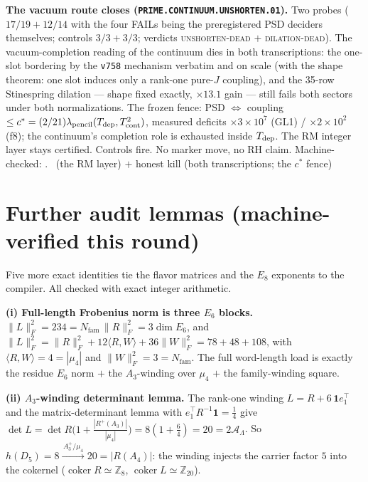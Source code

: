 \documentclass[11pt,a4paper]{article}
\newcommand{\Nfam}{N_{\mathrm{fam}}}
\newcommand{\AL}{\mathcal A_\Lambda}
\newcommand{\Z}{\mathbb{Z}}
\theoremstyle{definition}
\begin{document}
\par\smallskip\noindent\textbf{The vacuum route closes
(\texttt{PRIME.CONTINUUM.UNSHORTEN.01}).}
Two probes ($17/19+12/14$ with the four FAILs being the
preregistered PSD deciders themselves; controls $3/3+3/3$;
verdicts \textsc{unshorten-dead} $+$ \textsc{dilation-dead}).  The
vacuum-completion reading of the continuum dies in both
transcriptions: the one-slot bordering by the \texttt{v758}
mechanism verbatim and on scale (with the shape theorem: one slot
induces only a rank-one pure-$J$ coupling), and the 35-row
Stinespring dilation --- shape fixed exactly, $\times13.1$ gain
--- still fails both sectors under both normalizations.  The
frozen fence: PSD $\iff$ coupling $\le
c^*=(2/21)\lambda_{\rm pencil}(T_{\rm dep},T_{\rm cont}^2)$,
measured deficits $\times3\times10^7$ (GL1) /
$\times2\times10^2$ (f8); the continuum's completion role is
exhausted inside $T_{\rm dep}$.  The RM integer layer stays
certified.  Controls fire.  No marker move, no RH claim.
Machine-checked: .
\mE\ (the RM layer) $+$ honest kill (both transcriptions; the
$c^*$ fence)
\par\smallskip

\section{Further audit lemmas (machine-verified this round)}
Five more exact identities tie the flavor matrices and the $E_8$ exponents to the compiler. All checked
with exact integer arithmetic.

\par\smallskip\noindent\textbf{(i) Full-length Frobenius norm is three $E_6$ blocks.}
$\|L\|_F^2=234=\Nfam\,\|R\|_F^2=3\dim E_6$, and
$\|L\|_F^2=\|R\|_F^2+12\langle R,W\rangle+36\|W\|_F^2=78+48+108$,
with $\langle R,W\rangle=4=|\mu_4|$ and $\|W\|_F^2=3=\Nfam$. The full word-length load is exactly the
residue $E_6$ norm $+$ the $A_3$-winding over $\mu_4$ $+$ the family-winding square. \mE

\par\smallskip\noindent\textbf{(ii) $A_3$-winding determinant lemma.}
The rank-one winding $L=R+6\,\mathbf 1 e_1^\top$ and the matrix-determinant lemma with
$e_1^\top R^{-1}\mathbf 1=\tfrac14$ give
$\det L=\det R\bigl(1+\tfrac{|R^+(A_3)|}{|\mu_4|}\bigr)=8(1+\tfrac64)=20=2\AL$.
So $h(D_5)=8\xrightarrow{\,A_3^+/\mu_4\,}20=|R(A_4)|$: the winding injects the carrier factor $5$ into
the cokernel ($\operatorname{coker}R\simeq\Z_8$, $\operatorname{coker}L\simeq\Z_{20}$). \mE
\end{document}
